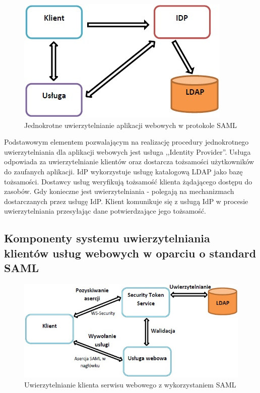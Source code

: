 		\begin{figure}[h]
			\centering
			\includegraphics{img/samlWeb.jpg}
			\caption{Jednokrotne uwierzytelnianie aplikacji webowych w protokole SAML}
			\label{webSSO}
		\end{figure}

		Podstawowym elementem pozwalającym na realizację procedury jednokrotnego uwierzytelniania dla aplikacji webowych jest usługa ,,Identity Provider''. Usługa odpowiada za uwierzytelnianie klientów oraz dostarcza tożsamości użytkowników do zaufanych aplikacji. IdP wykorzystuje usługę katalogową LDAP jako bazę tożsamości. Dostawcy usług weryfikują tożsamość klienta żądającego dostępu do zasobów. Gdy konieczne jest uwierzytelniania - polegają na mechanizmach dostarczanych przez usługę IdP. Klient komunikuje się z usługą IdP w procesie uwierzytelniania przesyłając dane potwierdzające jego tożsamość.

	\subsection{Komponenty systemu uwierzytelniania klientów usług webowych w oparciu o standard SAML}

		\begin{figure}[h]
			\centering
			\includegraphics{img/samlWS.jpg}
			\caption{Uwierzytelnianie klienta serwisu webowego z wykorzystaniem SAML}
			\label{Uwierzytelnianie klienta serwisu webowego z wykorzystaniem SAML}
		\end{figure}

